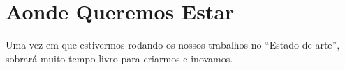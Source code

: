 \section{Aonde Queremos Estar}

Uma vez em que estivermos rodando os nossos trabalhos no ``Estado de arte'', sobrará muito tempo livro para criarmos e inovamos. 









